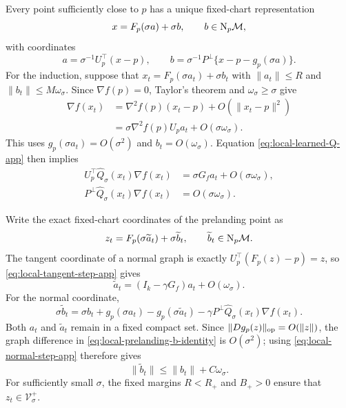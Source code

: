 Every point sufficiently close to $p$ has a unique fixed-chart
representation
\begin{equation}
  x=F_p(\sigma a)+\sigma b,\qquad b\in\mathrm{N}_p\mathcal{M},
  \label{eq:local-fixed-representation-app}
\end{equation}
with coordinates
\begin{equation}
  a=\sigma^{-1}U_p^\top(x-p),\qquad
  b=\sigma^{-1}P^\perp\{x-p-g_p(\sigma a)\}.
\end{equation}
For the induction, suppose that
$x_t=F_p(\sigma a_t)+\sigma b_t$ with
$\|a_t\|\le R$ and $\|b_t\|\le M\omega_\sigma$.  Since
$\nabla f(p)=0$, Taylor's theorem and $\omega_\sigma\ge\sigma$ give
\begin{align}
  \nabla f(x_t)
  &=
  \nabla^2f(p)(x_t-p)+O(\|x_t-p\|^2)\\
  &=
  \sigma\nabla^2f(p)U_pa_t+O(\sigma\omega_\sigma).
  \label{eq:local-gradient-expansion-app}
\end{align}
This uses
$g_p(\sigma a_t)=O(\sigma^2)$ and
$b_t=O(\omega_\sigma)$.  Equation
\eqref{eq:local-learned-Q-app} then implies
\begin{align}
  U_p^\top\widehat Q_\sigma(x_t)\nabla f(x_t)
  &=\sigma G_fa_t+O(\sigma\omega_\sigma),
  \label{eq:local-tangent-step-app}\\
  P^\perp\widehat Q_\sigma(x_t)\nabla f(x_t)
  &=O(\sigma\omega_\sigma).
  \label{eq:local-normal-step-app}
\end{align}

Write the exact fixed-chart coordinates of the prelanding point as
\begin{equation}
  z_t=F_p(\sigma\widetilde a_t)+\sigma\widetilde b_t,
  \qquad \widetilde b_t\in\mathrm{N}_p\mathcal{M}.
\end{equation}
The tangent coordinate of a normal graph is exactly
$U_p^\top(F_p(z)-p)=z$, so
\eqref{eq:local-tangent-step-app} gives
\begin{equation}
  \widetilde a_t
  =(I_k-\gamma G_f)a_t+O(\omega_\sigma).
  \label{eq:local-prelanding-a-app}
\end{equation}
For the normal coordinate,
\begin{equation}
  \sigma\widetilde b_t
  =
  \sigma b_t+g_p(\sigma a_t)-g_p(\sigma\widetilde a_t)
  -\gamma P^\perp\widehat Q_\sigma(x_t)\nabla f(x_t).
  \label{eq:local-prelanding-b-identity}
\end{equation}
Both $a_t$ and $\widetilde a_t$ remain in a fixed compact set.  Since
$\|Dg_p(z)\|_{\mathrm{op}}=O(\|z\|)$, the graph difference in
\eqref{eq:local-prelanding-b-identity} is $O(\sigma^2)$; using
\eqref{eq:local-normal-step-app} therefore gives
\begin{equation}
  \|\widetilde b_t\|
  \le\|b_t\|+C\omega_\sigma.
  \label{eq:local-prelanding-b-app}
\end{equation}
For sufficiently small $\sigma$, the fixed margins
$R<R_+$ and $B_+>0$ ensure that $z_t\in\mathcal V_\sigma^+$.

